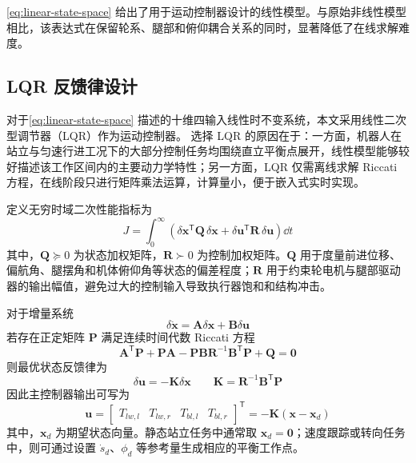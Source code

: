\eqref{eq:linear-state-space} 给出了用于运动控制器设计的线性模型。与原始非线性模型相比，该表达式在保留轮系、腿部和俯仰耦合关系的同时，显著降低了在线求解难度。

\subsection{LQR 反馈律设计}

对于\eqref{eq:linear-state-space} 描述的十维四输入线性时不变系统，本文采用线性二次型调节器（LQR）作为运动控制器\cite{klemm2020lqr}。
选择 LQR 的原因在于：一方面，机器人在站立与匀速行进工况下的大部分控制任务均围绕直立平衡点展开，线性模型能够较好描述该工作区间内的主要动力学特性；另一方面，LQR 仅需离线求解 Riccati 方程，在线阶段只进行矩阵乘法运算，计算量小，便于嵌入式实时实现。

定义无穷时域二次性能指标为
\begin{equation}
  J =
  \int_{0}^{\infty}
  \left(
    \delta \boldsymbol{x}^{\mathsf{T}}\boldsymbol{Q}\,\delta \boldsymbol{x}
    +
    \delta \boldsymbol{u}^{\mathsf{T}}\boldsymbol{R}\,\delta \boldsymbol{u}
  \right)\dd t
  \label{eq:lqr-cost}
\end{equation}
其中，$\boldsymbol{Q} \succeq 0$ 为状态加权矩阵，$\boldsymbol{R} \succ 0$ 为控制加权矩阵。$\boldsymbol{Q}$ 用于度量前进位移、偏航角、腿摆角和机体俯仰角等状态的偏差程度；$\boldsymbol{R}$ 用于约束轮电机与腿部驱动器的输出幅值，避免过大的控制输入导致执行器饱和和结构冲击。

对于增量系统
\begin{equation}
  \delta \dot{\boldsymbol{x}}
  =
  \boldsymbol{A}\delta \boldsymbol{x}
  +
  \boldsymbol{B}\delta \boldsymbol{u}
  \label{eq:lqr-system}
\end{equation}
若存在正定矩阵 $\boldsymbol{P}$ 满足连续时间代数 Riccati 方程
\begin{equation}
  \boldsymbol{A}^{\mathsf{T}}\boldsymbol{P}
  +
  \boldsymbol{P}\boldsymbol{A}
  -
  \boldsymbol{P}\boldsymbol{B}\boldsymbol{R}^{-1}\boldsymbol{B}^{\mathsf{T}}\boldsymbol{P}
  +
  \boldsymbol{Q}
  =
  \boldsymbol{0}
  \label{eq:riccati}
\end{equation}
则最优状态反馈律为
\begin{equation}
  \delta \boldsymbol{u}
  =
  -\boldsymbol{K}\delta \boldsymbol{x}
  \qquad
  \boldsymbol{K} =
  \boldsymbol{R}^{-1}\boldsymbol{B}^{\mathsf{T}}\boldsymbol{P}
  \label{eq:lqr-law}
\end{equation}
因此主控制器输出可写为
\begin{equation}
  \boldsymbol{u}
  =
  \begin{bmatrix}
    T_{lw,l} & T_{lw,r} & T_{bl,l} & T_{bl,r}
  \end{bmatrix}^{\mathsf{T}}
  =
  -
  \boldsymbol{K}
  \left(
    \boldsymbol{x} - \boldsymbol{x}_d
  \right)
  \label{eq:lqr-output}
\end{equation}
其中，$\boldsymbol{x}_d$ 为期望状态向量。静态站立任务中通常取 $\boldsymbol{x}_d = \boldsymbol{0}$；速度跟踪或转向任务中，则可通过设置 $\dot{s}_d$、$\phi_d$ 等参考量生成相应的平衡工作点。


